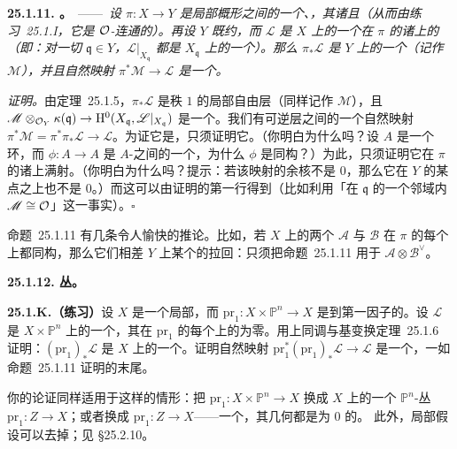 \textbf{25.1.11. \trhProposition。}\ ——\ \emph{设 $\pi\colon X\to Y$ 是局部\trNoether{}概形之间的一个\trFlat{}、\trProper{}\trMorphism，其诸\trFiber{}\trGeometricallyConnected{}且\trGeometricallyReduced（从而由\mbox{练习~25.1.I}，它是 $\mathcal{O}$-连通的）。再设 $Y$ 既约，而 $\mathscr{L}$ 是 $X$ 上的一个在 $\pi$ 的诸\trFiber{}上\trTrivial{}的\trInvertibleSheaf（即：对一切 $\mathfrak{q}\in Y$，$\mathscr{L}|_{X_{\mathfrak{q}}}$ 都是 $X_{\mathfrak{q}}$ 上的一个\trTrivial\trInvertibleSheaf）。那么 $\pi_*\mathscr{L}$ 是 $Y$ 上的一个\trInvertibleSheaf（记作 $\mathscr{M}$），并且自然映射 $\pi^*\mathscr{M}\to\mathscr{L}$ 是一个\trIsomorphism。}

\emph{证明。}\quad 由\mbox{\trGrauert{}定理~25.1.5}，$\pi_*\mathscr{L}$ 是秩 $1$ 的局部自由层（同样记作 $\mathscr{M}$），且 $\mathscr{M}\otimes_{\mathcal{O}_Y}\kappa(\mathfrak{q})\to\mathrm{H}^0(X_{\mathfrak{q}},\mathscr{L}|_{X_{\mathfrak{q}}})$ 是一个\trIsomorphism。我们有可逆层之间的一个自然映射 $\pi^*\mathscr{M}=\pi^*\pi_*\mathscr{L}\to\mathscr{L}$。为证它是\trIsomorphism，只须证明它\trSurjectiveMap{}。（你明白为什么吗？设 $A$ 是一个环，而 $\phi\colon A\to A$ 是 $A$-\trModule{}之间的一个\trSurjectiveMap{}，为什么 $\phi$ 是同构？）为此，只须证明它在 $\pi$ 的诸\trFiber{}上满射。（你明白为什么吗？提示：若该映射的余核不是 $0$，那么它在 $Y$ 的某点之上也不是 $0$。）而这可以由证明的第一行得到（比如利用「在 $\mathfrak{q}$ 的一个邻域内 $\mathscr{M}\cong\mathcal{O}$」这一事实）。\hfill$\square$

\mbox{命题~25.1.11} 有几条令人愉快的推论。比如，若 $X$ 上的两个\trInvertibleSheaf{} $\mathscr{A}$ 与 $\mathscr{B}$ 在 $\pi$ 的每个\trFiber{}上都同构，那么它们相差 $Y$ 上某个\trInvertibleSheaf{}的拉回：只须把\mbox{命题~25.1.11} 用于 $\mathscr{A}\otimes\mathscr{B}^{\vee}$。

\textbf{25.1.12. \trProjective{}丛。}

\textbf{25.1.K.（练习）}\quad 设 $X$ 是一个局部\trNoether{}\trScheme，而 $\mathrm{pr}_1\colon X\times\mathbb{P}^n\to X$ 是到第一因子的\trProjection。设 $\mathscr{L}$ 是 $X\times\mathbb{P}^n$ 上的一个\trLineBundle，其在 $\mathrm{pr}_1$ 的每个\trFiber{}上的\trDegree{}为零。用\mbox{上同调与基变换定理~25.1.6} 证明：$(\mathrm{pr}_1)_*\mathscr{L}$ 是 $X$ 上的一个\trInvertibleSheaf。证明自然映射 $\mathrm{pr}_1^*(\mathrm{pr}_1)_*\mathscr{L}\to\mathscr{L}$ 是一个\trIsomorphism，一如\mbox{命题~25.1.11} 证明的末尾。

你的论证同样适用于这样的情形：把 $\mathrm{pr}_1\colon X\times\mathbb{P}^n\to X$ 换成 $X$ 上的一个 $\mathbb{P}^n$-丛 $\mathrm{pr}_1\colon Z\to X$；或者换成 $\mathrm{pr}_1\colon Z\to X$——一个\trProper\trSmooth\trMorphism，其几何\trFiber{}都是\trGenus{}为 $0$ 的\trIntegral\trCurve。
此外，局部\trNoether{}假设可以去掉；见 \S25.2.10。

